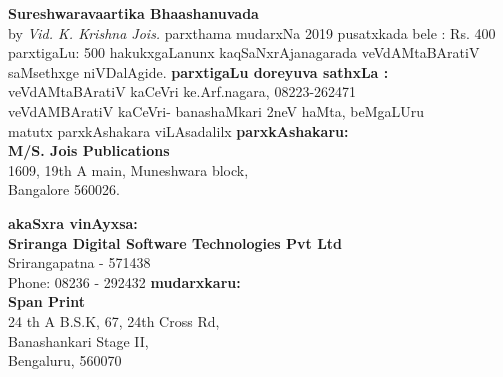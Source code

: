 \thispagestyle{empty}
\begin{flushleft}
{\rm{\textbf{Sureshwaravaartika Bhaashanuvada}\\by \textit{Vid. K. Krishna Jois.}}}
\vfill
parxthama mudarxNa {\rm {2019}}
\vfill
pusatxkada bele : {\rm {Rs. 400}}\\
parxtigaLu: {\rm {500}}
\vfill
hakukxgaLanunx kaqSaNxrAjanagarada veVdAMtaBAratiV saMsethxge niVDalAgide. 
\vfill
\textbf{parxtigaLu doreyuva sathxLa :}\\
veVdAMtaBAratiV kaCeVri ke.Arf.nagara, {\rm 08223-262471}\\
veVdAMBAratiV kaCeVri- banashaMkari 2neV haMta, beMgaLUru\\
matutx parxkAshakara viLAsadalilx
\vfill
\textbf{parxkAshakaru:}\\
{\rm {\textbf{M/S. Jois Publications} \\
1609, 19th A main, Muneshwara block,\\
Bangalore 560026.}}

\vfill
\textbf{akaSxra vinAyxsa:}\\ {\rm{\textbf{Sriranga Digital Software Technologies Pvt Ltd}\\ Srirangapatna - 571438\\ Phone: 08236 - 292432}}
\vfill
\textbf{mudarxkaru:}\\ {\rm{\textbf{Span Print}\\ 24 th A B.S.K, 67, 24th Cross Rd,\\ Banashankari Stage II,\\ Bengaluru, 560070}}

\end{flushleft}
